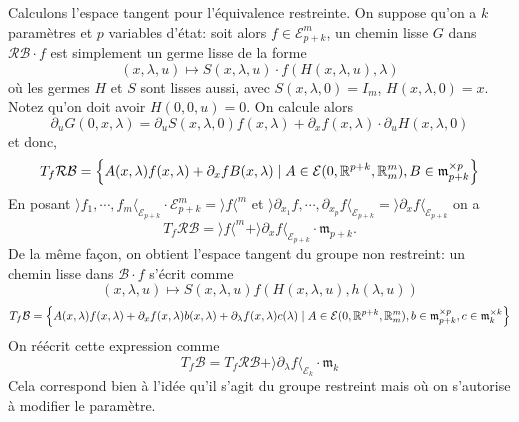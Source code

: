 \documentclass[memoire.tex]{subfiles}
\begin{document}
\begin{exemple}
    Calculons l'espace tangent pour 
    l'équivalence restreinte. On suppose qu'on 
    a $k$ paramètres et $p$ variables d'état: 
    soit alors $f\in\mathcal{E}^m_{p+k}$, un 
    chemin lisse $G$ dans $\mathcal{RB}\cdot f$ 
    est simplement un germe  lisse de la forme
    \begin{equation*}
         (x,\lambda,u)\mapsto S(x,\lambda,u)\cdot f(H(x,\lambda,u),
        \lambda)
    \end{equation*}
    où les germes $H$ et $S$ sont lisses aussi, 
    avec $S(x,\lambda,0)=I_m$, 
    $H(x,\lambda,0)=x$. Notez qu'on doit avoir $H(0,0,u)=0$.
    On calcule alors
    \begin{equation*}
        \partial_u G(0,x,\lambda)= 
         \partial_u S(x,\lambda,0)f(x,\lambda)+
         {\partial_x f}(x,\lambda) 
         \cdot {\partial_u H}(x,\lambda,0)
    \end{equation*}
    et donc,
    \begin{equation*}
        T_f\mathcal{RB}=\left\{ A(x,\lambda)f(x,\lambda)+ \partial_x f B(x,\lambda)
        \mid A\in\mathcal{E}(0,\mathbb{R}^{p+k},\mathbb{R}^m_m), B\in\mathfrak{m}^{\times p}_{p+k} \right\}
    \end{equation*}
    En posant $\rangle f_1,\cdots, f_m\langle_{\mathcal{E}_{p+k}}\cdot\mathcal{E}^m_{p+k}=\rangle f \langle^m$ et 
    $\rangle  \partial_{x_1}f,\cdots,\partial_{x_p}f\langle_{\mathcal{E}_{p+k}}=\rangle \partial_x f\langle_{\mathcal{E}_{p+k}}$
    on a
    \begin{equation*}
        T_f \mathcal{RB}=\rangle f \langle^m+\rangle \partial_x f\langle_{\mathcal{E}_{p+k}}\cdot\mathfrak{m}_{p+k} .
    \end{equation*}
    De la même façon, on obtient l'espace tangent du groupe non restreint: un chemin lisse dans $\mathcal{B}\cdot f$ s'écrit comme
    \begin{equation*}
        (x,\lambda,u)\mapsto 
        S(x,\lambda,u)f(H(x,\lambda,u),
        h(\lambda,u))
    \end{equation*}
    \begin{equation*}
        T_f\mathcal{B}=\left\{ A(x,\lambda)f(x,\lambda)+ \partial_x f(x,\lambda) b(x,\lambda) + \partial_\lambda f(x,\lambda) c(\lambda) \mid A\in\mathcal{E}(0,\mathbb{R}^{p+k},\mathbb{R}^m_m), b\in\mathfrak{m}^{\times p}_{p+k}, c\in\mathfrak{m}^{\times k}_k \right\}
    \end{equation*}
    On réécrit cette expression comme
    \begin{equation*}
        T_f \mathcal{B}
        =T_f\mathcal{RB} + 
        \rangle \partial_{\lambda} f\langle_{\mathcal{E}_{k}}\cdot\mathfrak{m}_{k}
    \end{equation*}
    Cela correspond bien à l'idée qu'il s'agit du groupe restreint mais où on s'autorise à modifier le paramètre.
\end{exemple}
\end{document}
